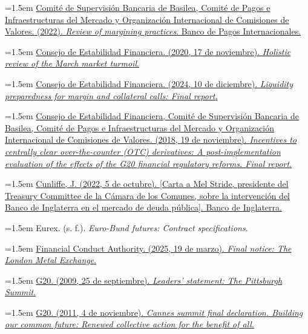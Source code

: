 \documentclass[10pt,a4paper]{article}
\begin{document}
\noindent\hangindent=1.5em \href{https://www.bis.org/bcbs/publ/d537.htm}{Comité de Supervisión Bancaria de Basilea, Comité de Pagos e Infraestructuras del Mercado y Organización Internacional de Comisiones de Valores. (2022). \textit{Review of margining practices}. Banco de Pagos Internacionales.}

\noindent\hangindent=1.5em \href{https://www.fsb.org/2020/11/holistic-review-of-the-march-market-turmoil/}{Consejo de Estabilidad Financiera. (2020, 17 de noviembre). \textit{Holistic review of the March market turmoil}.}

\noindent\hangindent=1.5em \href{https://www.fsb.org/2024/12/liquidity-preparedness-for-margin-and-collateral-calls-final-report/}{Consejo de Estabilidad Financiera. (2024, 10 de diciembre). \textit{Liquidity preparedness for margin and collateral calls: Final report}.}

\noindent\hangindent=1.5em \href{https://www.fsb.org/2018/11/incentives-to-centrally-clear-over-the-counter-otc-derivatives/}{Consejo de Estabilidad Financiera, Comité de Supervisión Bancaria de Basilea, Comité de Pagos e Infraestructuras del Mercado y Organización Internacional de Comisiones de Valores. (2018, 19 de noviembre). \textit{Incentives to centrally clear over-the-counter (OTC) derivatives: A post-implementation evaluation of the effects of the G20 financial regulatory reforms. Final report}.}

\noindent\hangindent=1.5em \href{https://www.bankofengland.co.uk/-/media/boe/files/letter/2022/october/letter-from-jon-cunliffe-ldi-5-october-2022}{Cunliffe, J. (2022, 5 de octubre). [Carta a Mel Stride, presidente del Treasury Committee de la Cámara de los Comunes, sobre la intervención del Banco de Inglaterra en el mercado de deuda pública]. Banco de Inglaterra.}

\noindent\hangindent=1.5em Eurex. (s. f.). \textit{Euro-Bund futures: Contract specifications}.

\noindent\hangindent=1.5em \href{https://www.fca.org.uk/publication/final-notices/london-metal-exchange-2025.pdf}{Financial Conduct Authority. (2025, 19 de marzo). \textit{Final notice: The London Metal Exchange}.}

\noindent\hangindent=1.5em \href{https://www.g20.utoronto.ca/2009/2009communique0925.html}{G20. (2009, 25 de septiembre). \textit{Leaders' statement: The Pittsburgh Summit}.}

\noindent\hangindent=1.5em \href{https://www.g20.utoronto.ca/2011/2011-cannes-declaration-111104-en.html}{G20. (2011, 4 de noviembre). \textit{Cannes summit final declaration. Building our common future: Renewed collective action for the benefit of all}.}
\end{document}
